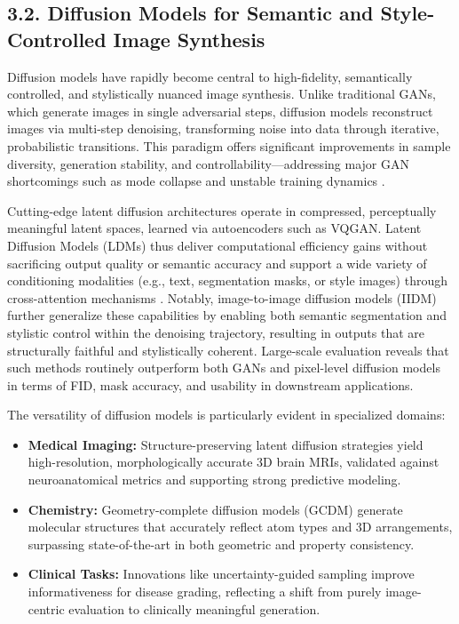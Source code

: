 \documentclass[11pt]{article}
\begin{document}
\subsection{3.2. Diffusion Models for Semantic and Style-Controlled Image Synthesis}

Diffusion models have rapidly become central to high-fidelity, semantically controlled, and stylistically nuanced image synthesis. Unlike traditional GANs, which generate images in single adversarial steps, diffusion models reconstruct images via multi-step denoising, transforming noise into data through iterative, probabilistic transitions. This paradigm offers significant improvements in sample diversity, generation stability, and controllability—addressing major GAN shortcomings such as mode collapse and unstable training dynamics \cite{ref76, ref90}.

Cutting-edge latent diffusion architectures operate in compressed, perceptually meaningful latent spaces, learned via autoencoders such as VQGAN. Latent Diffusion Models (LDMs) thus deliver computational efficiency gains without sacrificing output quality or semantic accuracy and support a wide variety of conditioning modalities (e.g., text, segmentation masks, or style images) through cross-attention mechanisms \cite{ref73, ref76, ref90, ref102}. Notably, image-to-image diffusion models (IIDM) further generalize these capabilities by enabling both semantic segmentation and stylistic control within the denoising trajectory, resulting in outputs that are structurally faithful and stylistically coherent. Large-scale evaluation reveals that such methods routinely outperform both GANs and pixel-level diffusion models in terms of FID, mask accuracy, and usability in downstream applications.

The versatility of diffusion models is particularly evident in specialized domains:
\begin{itemize}
    \item \textbf{Medical Imaging:} Structure-preserving latent diffusion strategies yield high-resolution, morphologically accurate 3D brain MRIs, validated against neuroanatomical metrics and supporting strong predictive modeling.
    \item \textbf{Chemistry:} Geometry-complete diffusion models (GCDM) generate molecular structures that accurately reflect atom types and 3D arrangements, surpassing state-of-the-art in both geometric and property consistency.
    \item \textbf{Clinical Tasks:} Innovations like uncertainty-guided sampling improve informativeness for disease grading, reflecting a shift from purely image-centric evaluation to clinically meaningful generation.
\end{itemize}
\end{document}
